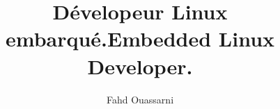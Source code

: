 
\author{Fahd Ouassarni}

\ifdefined\islangfr
\title{Dévelopeur Linux embarqué.}
\else\fi

\ifdefined\islangen
\title{Embedded Linux Developer.}
\else\fi

\address{6 Boulevard Mar\'echal Juin\\
         14000 CAEN}

\maketitle
